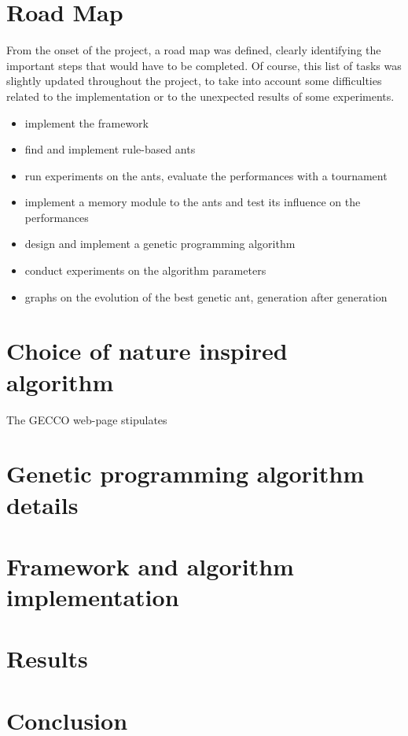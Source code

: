 \documentclass[10pt,a4paper]{article}
\begin{document}
\section{Road Map}

From the onset of the project, a road map was defined, clearly
identifying the important steps that would have to be completed. Of
course, this list of tasks was slightly updated throughout the
project, to take into account some difficulties related to the
implementation or to the unexpected results of some experiments.

\begin{itemize}
\item implement the framework
\item find and implement rule-based ants
\item run experiments on the ants, evaluate the performances with a tournament
\item implement a memory module to the ants and test its influence on the performances
\item design and implement a genetic programming algorithm
\item conduct experiments on the algorithm parameters
\item graphs on the evolution of the best genetic ant, generation after generation
\end{itemize}

\section{Choice of nature inspired algorithm}

The GECCO web-page stipulates

\section{Genetic programming algorithm details}

\section{Framework and algorithm implementation}

\section{Results}

\section*{Conclusion}
\end{document}
